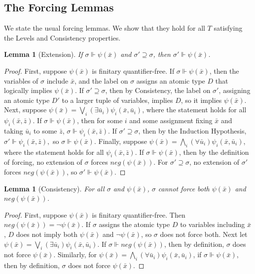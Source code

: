 \documentclass{article}
\newtheorem{lem}[thm]{Lemma}
\begin{document}
\subsection{The Forcing Lemmas}

We state the usual forcing lemmas.  We show that they hold for all $T$ satisfying the Levels and Consistency properties.       

\begin{lem} [Extension]  

If $\sigma\Vdash\psi(\bar{x})$ and $\sigma'\supseteq\sigma$, then $\sigma'\Vdash\psi(\bar{x})$.

\end{lem}

\begin{proof}

First, suppose $\psi(\bar{x})$ is finitary quantifier-free.  If $\sigma\Vdash\psi(\bar{x})$, then the variables of $\sigma$ include $\bar{x}$, and the label on $\sigma$ assigns an atomic type $D$ that logically implies $\psi(\bar{x})$.  If $\sigma'\supseteq\sigma$, then by Consistency, the label on $\sigma'$, assigning an atomic type $D'$ to a larger tuple of variables, implies $D$, so it implies $\psi(\bar{x})$.
Next, suppose $\psi(\bar{x}) = \bigvee_i(\exists\bar{u}_i)\psi_i(\bar{x},\bar{u}_i)$, where the statement holds for all $\psi_i(\bar{x},\bar{z})$.  If $\sigma\Vdash\psi(\bar{x})$, then for some $i$ and some assignment fixing $\bar{x}$ and taking $\bar{u}_i$ to some $\bar{z}$, $\sigma\Vdash\psi_i(\bar{x},\bar{z})$.  If $\sigma'\supseteq\sigma$, then by the Induction Hypothesis, $\sigma'\Vdash\psi_i(\bar{x},\bar{z}),$ so $\sigma\Vdash\psi(\bar{x})$.  
Finally, suppose $\psi(\bar{x}) = \bigwedge_i(\forall\bar{u}_i)\psi_i(\bar{x},\bar{u}_i)$, where the statement holds for all $\psi_i(\bar{x},\bar{z})$.  If $\sigma\Vdash\psi(\bar{x})$, then by the definition of forcing, no extension of $\sigma$ forces $neg(\psi(\bar{x}))$.  For $\sigma'\supseteq\sigma$, no extension of $\sigma'$ forces $neg(\psi(\bar{x}))$, so $\sigma'\Vdash\psi(\bar{x})$.    
\end{proof}

\begin{lem} [Consistency]  

For all $\sigma$ and $\psi(\bar{x})$, $\sigma$ cannot force both $\psi(\bar{x})$ and $neg(\psi(\bar{x}))$. 

\end{lem}

\begin{proof}

First, suppose $\psi(\bar{x})$ is finitary quantifier-free.  Then $neg(\psi(\bar{x})) = \neg{\psi(\bar{x})}$.  If $\sigma$ assigns the atomic type $D$ to variables including $\bar{x}$, $D$ does not imply both $\psi(\bar{x})$ and $\neg{\psi(\bar{x})}$, so $\sigma$ does not force both.  
Next let $\psi(\bar{x}) = \bigvee_i(\exists\bar{u}_i)\psi_i(\bar{x},\bar{u}_i)$.  If $\sigma\Vdash neg(\psi(\bar{x}))$, then by definition, $\sigma$ does not force $\psi(\bar{x})$.
Similarly, for $\psi(\bar{x}) = \bigwedge_i(\forall\bar{u}_i)\psi_i(\bar{x},\bar{u}_i)$, if $\sigma\Vdash\psi(\bar{x})$, then by definition, $\sigma$ does not force $\psi(\bar{x})$.  
\end{proof}
\end{document}
